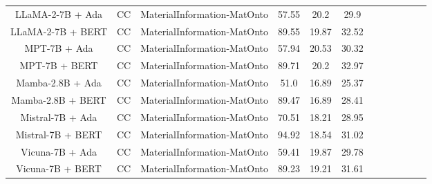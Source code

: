 \begin{table}
\begin{tabular}{|c|c|c|c|c|c|c|c|c|c|c|c|}
	LLaMA-2-7B + Ada  & CC & MaterialInformation-MatOnto  &  57.55 &  20.2 & 29.9  \\
	LLaMA-2-7B + BERT  & CC & MaterialInformation-MatOnto  &  89.55 &  19.87 & 32.52  \\
	MPT-7B + Ada  & CC & MaterialInformation-MatOnto  &  57.94 &  20.53 & 30.32  \\
	MPT-7B + BERT  & CC & MaterialInformation-MatOnto  &  89.71 &  20.2 & 32.97  \\
	Mamba-2.8B + Ada  & CC & MaterialInformation-MatOnto  &  51.0 &  16.89 & 25.37  \\
	Mamba-2.8B + BERT  & CC & MaterialInformation-MatOnto  &  89.47 &  16.89 & 28.41  \\
	Mistral-7B + Ada  & CC & MaterialInformation-MatOnto  &  70.51 &  18.21 & 28.95  \\
	Mistral-7B + BERT  & CC & MaterialInformation-MatOnto  &  94.92 &  18.54 & 31.02  \\
	Vicuna-7B + Ada  & CC & MaterialInformation-MatOnto  &  59.41 &  19.87 & 29.78  \\
	Vicuna-7B + BERT  & CC & MaterialInformation-MatOnto  &  89.23 &  19.21 & 31.61  \\
	\hline
\end{tabular}
    \end{table}









